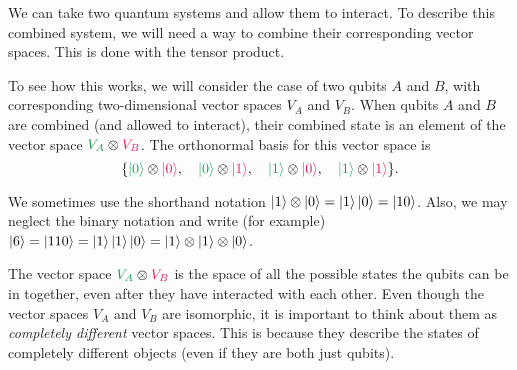 \documentclass[11pt]{article}
\begin{document}
We can take two quantum systems and allow them to interact. 
To describe this combined system, we will need a way to combine their corresponding vector spaces. This is done with the tensor product.

To see how this works, we will consider the case of two qubits {\color{ForestGreen}$A$} and {\color{WildStrawberry} $B$}, with corresponding two-dimensional vector spaces {\color{ForestGreen}$V_A$} and {\color{WildStrawberry} $V_B$}. 
When qubits {\color{ForestGreen}$A$} and {\color{WildStrawberry} $B$} are combined (and allowed to interact), their combined state is an element of the vector space ${\color{ForestGreen}V_A} \otimes {\color{WildStrawberry} V_B}$. The orthonormal basis for this vector space is
$$
\{
{\color{ForestGreen}\ket{0}} \otimes {\color{WildStrawberry} \ket{0}}, \quad
{\color{ForestGreen}\ket{0}} \otimes {\color{WildStrawberry} \ket{1}}, \quad 
{\color{ForestGreen}\ket{1}} \otimes {\color{WildStrawberry} \ket{0}}, \quad 
{\color{ForestGreen}\ket{1}} \otimes {\color{WildStrawberry} \ket{1}} \}.
$$

\begin{remark}[Notation]
	We sometimes use the shorthand notation $\ket{1}\otimes \ket{0} = \ket{1}\ket{0} = \ket{10}$. Also, we may neglect the binary notation and write (for example) $\ket{6} = \ket{110} = \ket{1} \ket{1} \ket{0} = \ket{1} \otimes \ket{1} \otimes \ket{0}$.
\end{remark}


The vector space ${\color{ForestGreen}V_A} \otimes {\color{WildStrawberry} V_B}$ is the space of all the possible states the qubits can be in together, even after they have interacted with each other.
Even though the vector spaces {\color{ForestGreen}$V_A$} and {\color{WildStrawberry} $V_B$} are isomorphic, it is important to think about them as \emph{completely different} vector spaces. This is because they describe the states of completely different objects (even if they are both just qubits).
\end{document}
